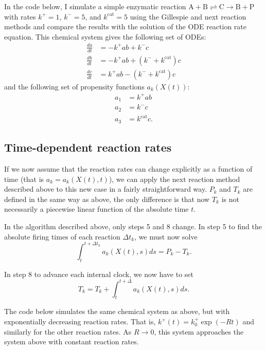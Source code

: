 \documentclass{article}
\begin{document}
In the code below, I simulate a simple enzymatic reaction
$\mathrm{A} + \mathrm{B} \rightleftharpoons \mathrm{C} \rightarrow
\mathrm{B} + \mathrm{P}$ with rates $k^+ = 1$, $k^- = 5$, and
$k^\text{cat} = 5$ using the Gillespie and next reaction methods and
compare the results with the solution of the ODE reaction rate
equation. This chemical system gives the following set of ODEs:
\begin{align}
\frac{da}{dt} &= -k^+ ab + k^- c \\
\frac{db}{dt} &= -k^+ ab + (k^- + k^\text{cat}) c \\
\frac{dc}{dt} &= k^+ ab - (k^- + k^\text{cat}) c
\end{align}
and the following set of propensity functions $a_k(X(t))$:
\begin{align}
a_1 &= k^+ ab \\
a_2 &= k^- c \\
a_3 &= k^\text{cat} c.
\end{align}

\subsection{Time-dependent reaction rates}
\label{sec:time-depend-react}

If we now assume that the reaction rates can change explicitly as a
function of time (that is $a_k = a_k(X(t), t)$), we can apply the next
reaction method described above to this new case in a fairly
straightforward way. $P_k$ and $T_k$ are defined in the same way as
above, the only difference is that now $T_k$ is not necessarily a
piecewise linear function of the absolute time $t$.

In the algorithm described above, only steps 5 and 8 change. In step 5
to find the absolute firing times of each reaction $\Delta t_k$, we
must now solve
\begin{equation}
  \int_t^{t + \Delta t_k} a_k(X(t), s) ds = P_k - T_k.
\end{equation}

In step 8 to advance each internal clock, we now have to set
\begin{equation}
T_k = T_k + \int_t^{t + \Delta} a_k(X(t), s) ds.
\end{equation}

The code below simulates the same chemical system as above, but with
exponentially decreasing reaction rates. That is,
$k^+(t) = k^+_0 \exp(-Rt)$ and similarly for the other reaction
rates. As $R \rightarrow 0$, this system approaches the system above
with constant reaction rates.
\end{document}
